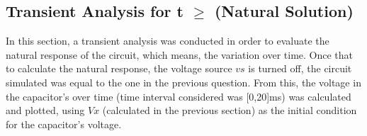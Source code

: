 

\subsection{Transient Analysis for t $\geq$ (Natural Solution)}

In this section, a transient analysis was conducted in order to evaluate the natural response of the circuit, which means, the variation over time. Once that to calculate the natural response, the voltage source $vs$ is turned off, the circuit simulated was equal to the one in the previous question. From this, the voltage in the capacitor's over time (time interval considered was [0,20]ms) was calculated and plotted, using $Vx$ (calculated in the previous section) as the initial condition for the capacitor's voltage.

